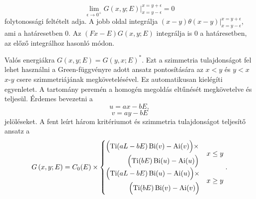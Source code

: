 \begin{equation}
	\lim_{\epsilon \to 0^+}\left.G\left(x,y;E \right)\right\rvert_{x = y - \epsilon}^{x = y + \epsilon} = 0
	\label{green:continuity}
\end{equation}
folytonossági feltételt adja. A jobb oldal integrálja $\left. \left(x - y\right) \theta\left(x - y\right) \right\rvert_{x=y-\epsilon}^{x=y+\epsilon}$, ami a határesetben $0$. Az $\left(Fx - E\right)G\left(x,y;E\right)$ integrálja is $0$ a határesetben, az előző integrálhoz hasonló módon.


Valós energiákra $G(x,y;E)=G(y,x;E)^*$. Ezt a szimmetria tulajdonságot fel lehet használni a Green-függvényre adott ansatz pontosítására az $x<y$ és $y<x$ $x$-$y$ csere szimmetriájának megkövetelésével. Ez automatikusan kielégíti  egyenletet. A tartomány peremén a homogén megoldás eltűnését megkövetelve  és  teljesül. Érdemes bevezetni a
\begin{equation}
	u = ax-bE,
\end{equation}
\begin{equation}
	v = ay-bE
\end{equation}
jelöléseket. A fent leírt három kritériumot és szimmetria tulajdonságot teljesítő ansatz a
\begin{equation}
	G\left(x,y;E\right) = C_0(E)\times
	\begin{cases}
		\begin{split}
			\Bigl(\operatorname{Ti}(aL-bE)\operatorname{Bi}(v)-\operatorname{Ai}(v)\Bigr)\times\\
			\Bigl(\operatorname{Ti}(bE)\operatorname{Bi}(u)-\operatorname{Ai}(u)\Bigr)
		\end{split}& x \leq y\\
		\begin{split}
			\Bigl(\operatorname{Ti}(aL-bE)\operatorname{Bi}(u)-\operatorname{Ai}(u)\Bigr)\times\\
			\Bigl(\operatorname{Ti}(bE)\operatorname{Bi}(v)-\operatorname{Ai}(v)\Bigr)
		\end{split}& x \geq y
	\end{cases}.
\end{equation}
